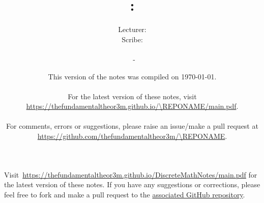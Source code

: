\documentclass[a4paper, 12pt, openany, oneside]{book}
\title{\vspace{-2em} {\huge \COURSENUMBER: \COURSENAME}}
\author{
    Lecturer: \LECTURER \\
    Scribe: \SCRIBE
    \\ \hfill \\
    \UNIVERSITY\ - \TERM}
\date{
    This version of the notes was compiled on \today.
    \\ \hfill \\
    For the latest version of these notes, visit \\
    {\normalsize\url{https://thefundamentaltheor3m.github.io/\REPONAME/main.pdf}}.
    \\ \hfill \\
    For comments, errors or suggestions, please raise an issue/make a pull request at \\
    {\normalsize\url{https://github.com/thefundamentaltheor3m/\REPONAME}}.
}
\def\REPONAME{DiscreteMathNotes}
\begin{document}
\setlength{\abovedisplayskip}{7.5pt}  %
\setlength{\belowdisplayskip}{7.5pt}  %
\setlength{\abovedisplayshortskip}{2pt}
\setlength{\belowdisplayshortskip}{2pt}

\maketitle
\thispagestyle{empty}

\tableofcontents
\thispagestyle{empty}

\newpage













% 

\newpage



%
\printbibliography
{}
\thispagestyle{empty}

Visit~\url{https://thefundamentaltheor3m.github.io/\REPONAME/main.pdf} for the latest version of these notes. If you have any suggestions or corrections, please feel free to fork and make a pull request to the \href{https://github.com/thefundamentaltheor3m/\REPONAME}{associated GitHub repository}.
\end{document}
